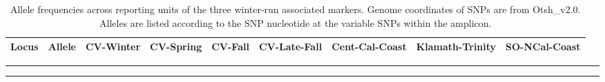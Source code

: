 


\begin{table}
\caption[Allele frequencies of winter-run-associated polymorphisms]{Allele frequencies across reporting units of the three winter-run associated
markers. Genome coordinates of SNPs are from Otsh\_v2.0. Alleles are listed according to the SNP nucleotide
at the variable SNPs within the amplicon.}
\label{tab:wrap-freqs}
{\footnotesize
\begin{tabular*}{\columnwidth}{@{\extracolsep{\fill}} lrrrrrrrr}
\hline\hline
Locus&Allele&CV-Winter&CV-Spring&CV-Fall&CV-Late-Fall&Cent-Cal-Coast&Klamath-Trinity&SO-NCal-Coast \\ \hline

\end{tabular*}
}
\vspace*{-2.3ex}\hrule\vspace*{0.3ex}\hrule
\end{table}
